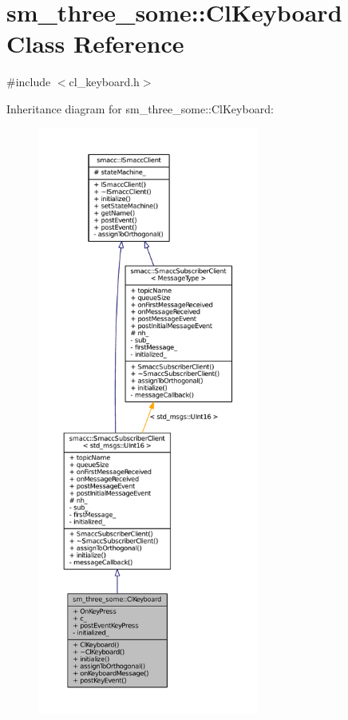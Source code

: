 \hypertarget{classsm__three__some_1_1ClKeyboard}{}\section{sm\+\_\+three\+\_\+some\+:\+:Cl\+Keyboard Class Reference}
\label{classsm__three__some_1_1ClKeyboard}


{\ttfamily \#include $<$cl\+\_\+keyboard.\+h$>$}



Inheritance diagram for sm\+\_\+three\+\_\+some\+:\+:Cl\+Keyboard\+:
\nopagebreak
\begin{figure}[H]
\begin{center}
\leavevmode
\includegraphics[height=550pt]{classsm__three__some_1_1ClKeyboard__inherit__graph}
\end{center}
\end{figure}


